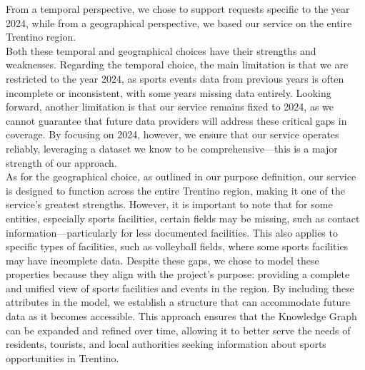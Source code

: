 \noindent From a temporal perspective, we chose to support requests specific to the year 2024, while from a geographical perspective, we based our service on the entire Trentino region. \\
Both these temporal and geographical choices have their strengths and weaknesses. Regarding the temporal choice, the main limitation is that we are restricted to the year 2024, as sports events data from previous years is often incomplete or inconsistent, with some years missing data entirely. Looking forward, another limitation is that our service remains fixed to 2024, as we cannot guarantee that future data providers will address these critical gaps in coverage. By focusing on 2024, however, we ensure that our service operates reliably, leveraging a dataset we know to be comprehensive—this is a major strength of our approach. \\
As for the geographical choice, as outlined in our purpose definition, our service is designed to function across the entire Trentino region, making it one of the service’s greatest strengths. However, it is important to note that for some entities, especially sports facilities, certain fields may be missing, such as contact information—particularly for less documented facilities. This also applies to specific types of facilities, such as volleyball fields, where some sports facilities may have incomplete data. Despite these gaps, we chose to model these properties because they align with the project’s purpose: providing a complete and unified view of sports facilities and events in the region. By including these attributes in the model, we establish a structure that can accommodate future data as it becomes accessible. This approach ensures that the Knowledge Graph can be expanded and refined over time, allowing it to better serve the needs of residents, tourists, and local authorities seeking information about sports opportunities in Trentino.

